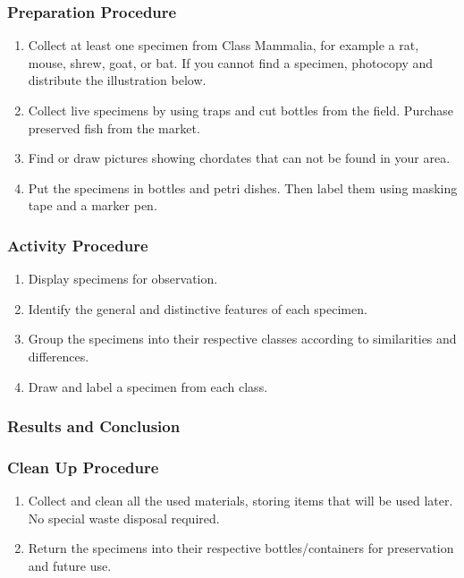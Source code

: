 \subsubsection*{Preparation Procedure}
\begin{enumerate}
\item{Collect at least one specimen from Class Mammalia, for example a rat, mouse, shrew, goat, or bat. If you cannot find a specimen, photocopy and distribute the illustration below.}
\item{Collect live specimens by using traps and cut bottles from the field. Purchase preserved fish from the market.}
\item{Find or draw pictures showing chordates that can not be found in your area.}
\item{Put the specimens in bottles and petri dishes. Then label them using masking tape and a marker pen.}
\end{enumerate}

\subsubsection*{Activity Procedure}
\begin{enumerate}
\item{Display specimens for observation.}
\item{Identify the general and distinctive features of each specimen.}
\item{Group the specimens into their respective classes according to similarities and differences.}
\item{Draw and label a specimen from each class.}
\end{enumerate}

\subsubsection*{Results and Conclusion}


\subsubsection*{Clean Up Procedure}
\begin{enumerate}
\item{Collect and clean all the used materials, storing items that will be used later. No special waste disposal required.}
\item{Return the specimens into their respective bottles/containers for preservation and future use.}
\end{enumerate}

